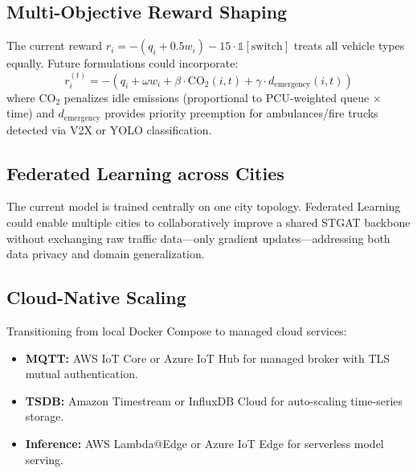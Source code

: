 \documentclass[12pt, onecolumn]{IEEEtran}
\begin{document}
\subsection{Multi-Objective Reward Shaping}
The current reward $r_i = -(q_i + 0.5 w_i) - 15 \cdot \mathbb{1}[\text{switch}]$ treats all vehicle types equally. Future formulations could incorporate:
\begin{equation}
    r_i^{(t)} = -\left( q_i + \omega w_i + \beta \cdot \text{CO}_2(i,t) + \gamma \cdot d_{\text{emergency}}(i,t) \right)
\end{equation}
where $\text{CO}_2$ penalizes idle emissions (proportional to PCU-weighted queue $\times$ time) and $d_{\text{emergency}}$ provides priority preemption for ambulances/fire trucks detected via V2X or YOLO classification.

\subsection{Federated Learning across Cities}
The current model is trained centrally on one city topology. Federated Learning could enable multiple cities to collaboratively improve a shared STGAT backbone without exchanging raw traffic data---only gradient updates---addressing both data privacy and domain generalization.

\subsection{Cloud-Native Scaling}
Transitioning from local Docker Compose to managed cloud services:
\begin{itemize}
    \item \textbf{MQTT:} AWS IoT Core or Azure IoT Hub for managed broker with TLS mutual authentication.
    \item \textbf{TSDB:} Amazon Timestream or InfluxDB Cloud for auto-scaling time-series storage.
    \item \textbf{Inference:} AWS Lambda@Edge or Azure IoT Edge for serverless model serving.
\end{itemize}
\end{document}
